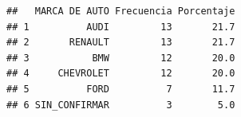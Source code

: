 \documentclass[
]{article}
\newenvironment{Shaded}{\begin{snugshade}}{\end{snugshade}}
\newcommand{\DecValTok}[1]{\textcolor[rgb]{0.00,0.00,0.81}{#1}}
\newcommand{\FunctionTok}[1]{\textcolor[rgb]{0.13,0.29,0.53}{\textbf{#1}}}
\newcommand{\NormalTok}[1]{#1}
\newcommand{\OtherTok}[1]{\textcolor[rgb]{0.56,0.35,0.01}{#1}}
\newcommand{\SpecialCharTok}[1]{\textcolor[rgb]{0.81,0.36,0.00}{\textbf{#1}}}
\begin{document}
\begin{Shaded}
\end{Shaded}

\begin{verbatim}
##   MARCA DE AUTO Frecuencia Porcentaje
## 1          AUDI         13       21.7
## 2       RENAULT         13       21.7
## 3           BMW         12       20.0
## 4     CHEVROLET         12       20.0
## 5          FORD          7       11.7
## 6 SIN_CONFIRMAR          3        5.0
\end{verbatim}
\end{document}
